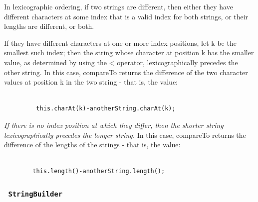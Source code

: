 \documentclass{scrartcl}
\begin{document}
     In lexicographic ordering, if two strings are different, then either they have different characters at some index that is a valid index for both strings, or their lengths are different, or both.

     If they have different characters at one or more index positions, let k be the smallest such index; then the string whose character at position k has the smaller value, as determined by using the < operator, lexicographically precedes the other string. In this case, compareTo returns the difference of the two character values at position k in the two string - that is, the value:

     \begin{lstlisting}

         this.charAt(k)-anotherString.charAt(k);

     \end{lstlisting}

     \textit{If there is no index position at which they differ, then the shorter string lexicographically precedes the longer string.} In this case, compareTo returns the difference of the lengths of the strings - that is, the value:

     \begin{lstlisting}

        this.length()-anotherString.length();

     \end{lstlisting}




 \subsubsection{\lstinline$ StringBuilder $}
\end{document}
